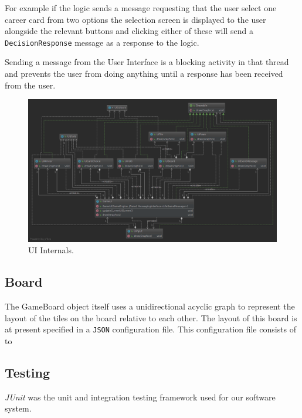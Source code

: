 \documentclass[a4paper, 11pt]{article}
\begin{document}
	For example if the logic sends a message requesting that the user select one career card from two options the selection screen is displayed to the user alongside the relevant buttons and clicking either of these will send a \texttt{DecisionResponse} message as a response to the logic.
	
	Sending a message from the User Interface is a blocking activity in that thread and prevents the user from doing anything until a response has been received from the user.
	\begin{figure}[!h]
		\centering
		\includegraphics[scale=.35]{uml/ui_uml}
		\caption{UI Internals.}
		\label{fig:ui_uml}
	\end{figure}
	
	\subsection*{Board}
	The GameBoard object itself uses a unidirectional acyclic graph to represent the layout of the tiles on the board relative to each other. The layout of this board is at present specified in a \texttt{JSON} configuration file. This configuration file consists of to
	
	\subsection*{Testing}
	\textit{JUnit} was the unit and integration testing framework used for our software system.
	
	
\end{document}
